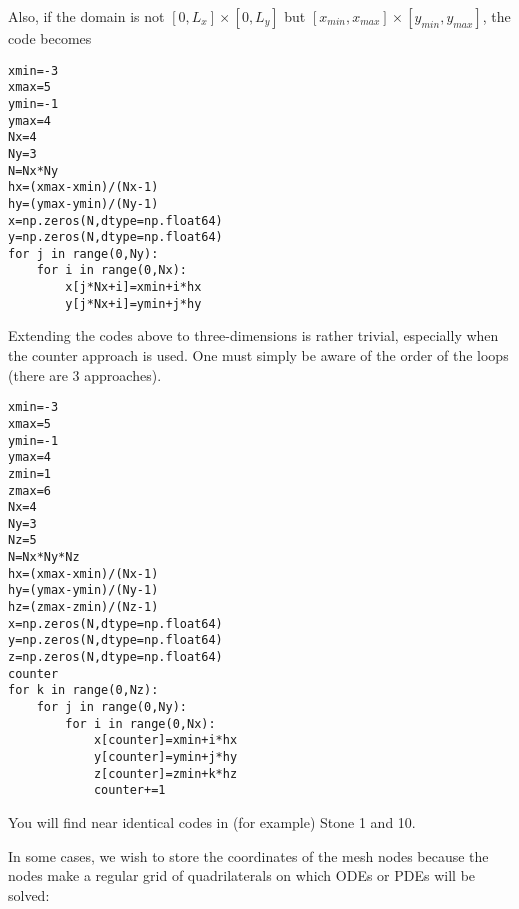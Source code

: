 Also, if the domain is not $[0,L_x]\times[0,L_y]$ but
$[x_{min},x_{max}]\times[y_{min},y_{max}]$, the code becomes
\begin{lstlisting}
xmin=-3
xmax=5
ymin=-1
ymax=4
Nx=4
Ny=3
N=Nx*Ny
hx=(xmax-xmin)/(Nx-1)
hy=(ymax-ymin)/(Ny-1)
x=np.zeros(N,dtype=np.float64)
y=np.zeros(N,dtype=np.float64)
for j in range(0,Ny):
    for i in range(0,Nx):
        x[j*Nx+i]=xmin+i*hx
        y[j*Nx+i]=ymin+j*hy
\end{lstlisting}

\vspace{.8cm}

Extending the codes above to three-dimensions is rather trivial, especially when the counter approach 
is used. One must simply be aware of the order of the loops (there are 3 approaches).
\begin{lstlisting}
xmin=-3
xmax=5
ymin=-1
ymax=4
zmin=1
zmax=6
Nx=4
Ny=3
Nz=5
N=Nx*Ny*Nz
hx=(xmax-xmin)/(Nx-1)
hy=(ymax-ymin)/(Ny-1)
hz=(zmax-zmin)/(Nz-1)
x=np.zeros(N,dtype=np.float64)
y=np.zeros(N,dtype=np.float64)
z=np.zeros(N,dtype=np.float64)
counter
for k in range(0,Nz):
    for j in range(0,Ny):
        for i in range(0,Nx):
            x[counter]=xmin+i*hx
            y[counter]=ymin+j*hy
            z[counter]=zmin+k*hz
            counter+=1
\end{lstlisting}
You will find near identical codes in (for example) Stone 1 and 10.

\vspace{.8cm}

In some cases, we wish to store the coordinates of the mesh nodes because the nodes 
make a regular grid of quadrilaterals on which ODEs or PDEs will be solved:

